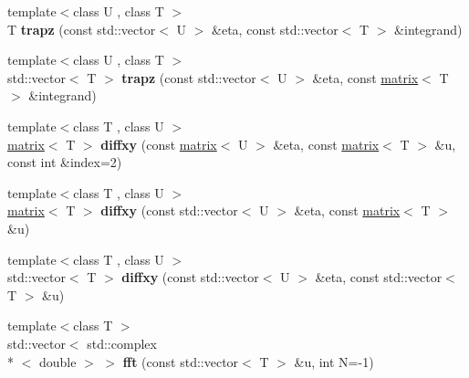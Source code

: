 \begin{DoxyCompactItemize}
\item 
\hypertarget{namespacekeycpp_af1e3b00481455a363456bcdc8ab407fb}{{\footnotesize template$<$class U , class T $>$ }\\T {\bfseries trapz} (const std\-::vector$<$ U $>$ \&eta, const std\-::vector$<$ T $>$ \&integrand)}\label{namespacekeycpp_af1e3b00481455a363456bcdc8ab407fb}

\item 
\hypertarget{namespacekeycpp_a3172e450b1174671f2fddc9e3d71a764}{{\footnotesize template$<$class U , class T $>$ }\\std\-::vector$<$ T $>$ {\bfseries trapz} (const std\-::vector$<$ U $>$ \&eta, const \hyperlink{classkeycpp_1_1matrix}{matrix}$<$ T $>$ \&integrand)}\label{namespacekeycpp_a3172e450b1174671f2fddc9e3d71a764}

\item 
\hypertarget{namespacekeycpp_a7124131346b73357a9e7d8e7c4ae9cc9}{{\footnotesize template$<$class T , class U $>$ }\\\hyperlink{classkeycpp_1_1matrix}{matrix}$<$ T $>$ {\bfseries diffxy} (const \hyperlink{classkeycpp_1_1matrix}{matrix}$<$ U $>$ \&eta, const \hyperlink{classkeycpp_1_1matrix}{matrix}$<$ T $>$ \&u, const int \&index=2)}\label{namespacekeycpp_a7124131346b73357a9e7d8e7c4ae9cc9}

\item 
\hypertarget{namespacekeycpp_af805809516d8ef219573c6f3e4cbd077}{{\footnotesize template$<$class T , class U $>$ }\\\hyperlink{classkeycpp_1_1matrix}{matrix}$<$ T $>$ {\bfseries diffxy} (const std\-::vector$<$ U $>$ \&eta, const \hyperlink{classkeycpp_1_1matrix}{matrix}$<$ T $>$ \&u)}\label{namespacekeycpp_af805809516d8ef219573c6f3e4cbd077}

\item 
\hypertarget{namespacekeycpp_a2e73976d2cf44b145d261f52c4bcdf5f}{{\footnotesize template$<$class T , class U $>$ }\\std\-::vector$<$ T $>$ {\bfseries diffxy} (const std\-::vector$<$ U $>$ \&eta, const std\-::vector$<$ T $>$ \&u)}\label{namespacekeycpp_a2e73976d2cf44b145d261f52c4bcdf5f}

\item 
\hypertarget{namespacekeycpp_adec9b07955f64a93dc76db37eea6656d}{{\footnotesize template$<$class T $>$ }\\std\-::vector$<$ std\-::complex\\*
$<$ double $>$ $>$ {\bfseries fft} (const std\-::vector$<$ T $>$ \&u, int N=-\/1)}\label{namespacekeycpp_adec9b07955f64a93dc76db37eea6656d}


\end{DoxyCompactItemize}
